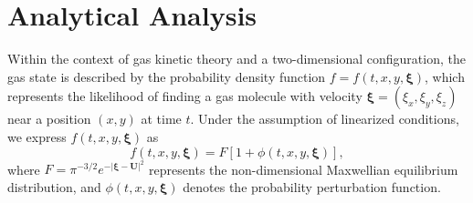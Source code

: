 \section{Analytical Analysis}
Within the context of gas kinetic theory and a two-dimensional configuration, the gas state is described by the probability density function $f=f\left(t,x,y,\boldsymbol{\xi}\right)$, which represents the likelihood of finding a gas molecule with velocity $\boldsymbol{\xi}=\left(\xi_x,\xi_y,\xi_z\right)$ near a position $\left(x,y\right)$ at time $t$. Under the assumption of linearized conditions, we express $f(t,x,y,\boldsymbol{\xi})$ as
\begin{equation} \label{eq:perturbed_Maxwell}
    f\left(t,x,y,\boldsymbol{\xi}\right)
    =
    F\left[1+\phi\left(t,x,y,\boldsymbol{\xi}\right)\right],
\end{equation}
where $F=\pi^{-3/2}e^{-\left|\boldsymbol{\xi}-\mathbf{U}\right|^2}$ represents the non-dimensional Maxwellian equilibrium distribution, and $\phi\left(t,x,y,\boldsymbol{\xi}\right)$ denotes the probability perturbation function.

